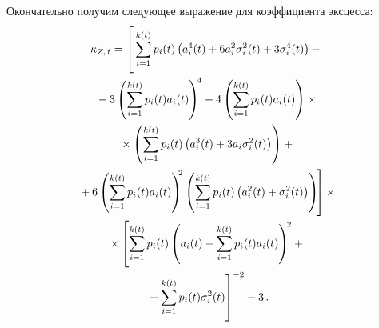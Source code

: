 \begin{multicols}{2}
Окончательно получим следующее выражение для коэффициента эксцесса:
\begin{multline}
\kappa_{Z,\,t}=\left[
\vphantom{\left(a_i(t)-
\sum\limits_{i=1}^{k(t)} p_i(t) a_i(t)\right)^2}
\sum\limits_{i=1}^{k(t)} p_i(t)\left(
a_i^4(t)+6a_i^2\sigma_i^2(t)+3\sigma_i^4(t)\right)-{}\right.\\
{}-3\left(
\sum\limits_{i=1}^{k(t)} p_i(t) a_i(t)\right)^{\!4}-
4\left(\sum\limits_{i=1}^{k(t)} p_i(t) a_i(t)\right) \times{}\\
{}\times
\left(\sum\limits_{i=1}^{k(t)} p_i(t)\left(a_i^3(t)+
3a_i\sigma_i^2(t)\right)\right)+{}\\
\left.{}+6\left(\sum\limits_{i=1}^{k(t)} p_i(t) a_i(t)\right)^{\!\!2}\left(
\sum\limits_{i=1}^{k(t)} p_i(t) \left(a_i^2(t) + 
\sigma_i^2(t)\right)\right)\!\right]\times{}\\
{}\times\left[\sum\limits_{i=1}^{k(t)} p_i(t) \left(a_i(t)-
\sum\limits_{i=1}^{k(t)} p_i(t) a_i(t)\right)^{\!2}+{}\right.\\
\left.{}+
\sum\limits_{i=1}^{k(t)} p_i(t) \sigma_i^2(t)
\vphantom{\left(a_i(t)-
\sum\limits_{i=1}^{k(t)} p_i(t) a_i(t)\right)^2}
\right]^{-2}-3\,.
\label{Kurtosis}
\end{multline}


\end{multicols}
